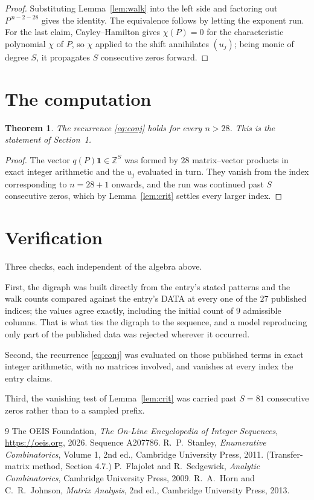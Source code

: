 \documentclass[11pt,a4paper]{article}
\theoremstyle{plain}
\newtheorem{theorem}{Theorem}
\theoremstyle{definition}
\begin{document}
\begin{proof}
Substituting Lemma~\ref{lem:walk} into the left side and factoring out
$P^{\,n-2-28}$ gives the identity. The equivalence follows by letting the exponent
run. For the last claim, Cayley--Hamilton gives $\chi(P)=0$ for the characteristic
polynomial $\chi$ of $P$, so $\chi$ applied to the shift annihilates $(u_j)$; being monic of
degree $S$, it propagates $S$ consecutive zeros forward.
\end{proof}

\section{The computation}

\begin{theorem}
The recurrence \eqref{eq:conj} holds for every $n>28$. This is the statement of
Section~1.
\end{theorem}

\begin{proof}
The vector $q(P)\mathbf{1}\in\mathbb{Z}^{S}$ was formed by $28$ matrix--vector
products in exact integer arithmetic and the $u_j$ evaluated in turn. They vanish from the
index corresponding to $n=28+1$ onwards, and the run was continued past $S$ consecutive
zeros, which by Lemma~\ref{lem:crit} settles every larger index.
\end{proof}

\section{Verification}

Three checks, each independent of the algebra above.

First, the digraph was built directly from the entry's stated patterns and the walk counts
compared against the entry's DATA at every one of the $27$ published indices; the
values agree exactly, including the initial count of $9$ admissible columns. That is
what ties the digraph to the sequence, and a model reproducing only part of the published
data was rejected wherever it occurred.

Second, the recurrence \eqref{eq:conj} was evaluated on those published terms in exact
integer arithmetic, with no matrices involved, and vanishes at every index the entry claims.

Third, the vanishing test of Lemma~\ref{lem:crit} was carried past $S=81$ consecutive
zeros rather than to a sampled prefix.

\begin{thebibliography}{9}
 The OEIS Foundation, \emph{The On-Line Encyclopedia of Integer
Sequences}, \url{https://oeis.org}, 2026. Sequence A207786.
 R.~P.~Stanley, \emph{Enumerative Combinatorics}, Volume 1, 2nd ed.,
Cambridge University Press, 2011. (Transfer-matrix method, Section 4.7.)
 P.~Flajolet and R.~Sedgewick, \emph{Analytic Combinatorics}, Cambridge
University Press, 2009.
 R.~A.~Horn and C.~R.~Johnson, \emph{Matrix Analysis}, 2nd ed., Cambridge
University Press, 2013.
\end{thebibliography}
\end{document}
